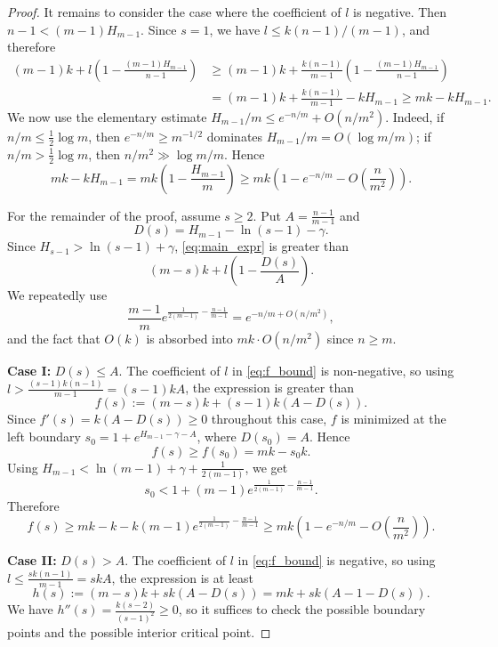 \documentclass[usenames,dvipsnames, 11pt]{article}
\numberwithin{thm}{section}
\theoremstyle{definition}
\theoremstyle{definition}
\theoremstyle{definition}
\newcommand{\1}{\mathbf{1}}
\begin{document}
\begin{proof}
    It remains to consider the case where the coefficient of $l$ is negative.
    Then $n-1<(m-1)H_{m-1}$. Since $s=1$, we have
    $l\leq k(n-1)/(m-1)$, and therefore
    \begin{align*}
    (m-1)k+
    l\left(1-\frac{(m-1)H_{m-1}}{n-1}\right)
    &\geq
    (m-1)k+
    \frac{k(n-1)}{m-1}
    \left(1-\frac{(m-1)H_{m-1}}{n-1}\right)  \\
    &=
    (m-1)k+\frac{k(n-1)}{m-1}-kH_{m-1}
    \geq
    mk-kH_{m-1}.
    \end{align*}
    We now use the elementary estimate
    $H_{m-1}/m\leq e^{-n/m}+O(n/m^2)$. Indeed, if
    $n/m\leq \frac12\log m$, then $e^{-n/m}\geq m^{-1/2}$ dominates
    $H_{m-1}/m=O(\log m/m)$; if $n/m>\frac12\log m$, then
    $n/m^2\gg \log m/m$. Hence
    \[
    mk-kH_{m-1}
    =
    mk\left(1-\frac{H_{m-1}}{m}\right)
    \geq
    mk\left(1-e^{-n/m}-O\left(\frac{n}{m^2}\right)\right).
    \]
    
        For the remainder of the proof, assume $s\geq 2$. Put
    $A=\frac{n-1}{m-1}$ and
    \[
    D(s)=H_{m-1}-\ln(s-1)-\gamma.
    \]
    Since $H_{s-1}>\ln(s-1)+\gamma$, \eqref{eq:main_expr} is greater than
    \begin{equation}\label{eq:f_bound}
    (m-s)k+l\left(1-\frac{D(s)}{A}\right).
    \end{equation}
    We repeatedly use
    \[
    \frac{m-1}{m}e^{\frac{1}{2(m-1)}-\frac{n-1}{m-1}}
    =
    e^{-n/m+O(n/m^2)},
    \]
    and the fact that $O(k)$ is absorbed into $mk\cdot O(n/m^2)$ since
    $n\geq m$.

    \textbf{Case I:} $D(s)\leq A$. The coefficient of $l$ in
    \eqref{eq:f_bound} is non-negative, so using
    $l>\frac{(s-1)k(n-1)}{m-1}=(s-1)kA$, the expression is greater than
    \[
    f(s):=(m-s)k+(s-1)k(A-D(s)).
    \]
    Since $f'(s)=k(A-D(s))\geq 0$ throughout this case, $f$ is minimized at
    the left boundary $s_0=1+e^{H_{m-1}-\gamma-A}$, where $D(s_0)=A$. Hence
    \[
    f(s)\geq f(s_0)=mk-s_0k.
    \]
    Using $H_{m-1}<\ln(m-1)+\gamma+\frac{1}{2(m-1)}$, we get
    \[
    s_0<1+(m-1)e^{\frac{1}{2(m-1)}-\frac{n-1}{m-1}}.
    \]
    Therefore
    \[
    f(s)
    \geq
    mk-k-k(m-1)e^{\frac{1}{2(m-1)}-\frac{n-1}{m-1}}
    \geq
    mk\left(1-e^{-n/m}-O\left(\frac{n}{m^2}\right)\right).
    \]

    \textbf{Case II:} $D(s)>A$. The coefficient of $l$ in
    \eqref{eq:f_bound} is negative, so using
    $l\leq \frac{sk(n-1)}{m-1}=skA$, the expression is at least
    \[
    h(s):=(m-s)k+sk(A-D(s))
    =
    mk+sk(A-1-D(s)).
    \]
    We have $h''(s)=\frac{k(s-2)}{(s-1)^2}\geq 0$, so it suffices to check
    the possible boundary points and the possible interior critical point.


\end{proof}
\end{document}
